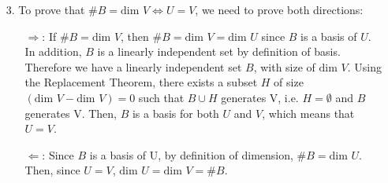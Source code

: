 \documentclass{article}
\begin{document}
\newpage
\begin{itemize}
	\item [3.] To prove that $\#B=\text{dim }V \Leftrightarrow U=V$, we need to prove both directions:
	      \begin{itemize}
		      \item [$\Rightarrow$:] If $\#B=\text{dim }V$, then $\#B=\text{dim }V=\text{dim }U$ since $B$ is a basis of $U$. In addition, $B$ is a linearly independent set by definition of basis. Therefore we have a linearly independent set $B$, with size of $\text{dim }V$. Using the Replacement Theorem, there exists a subset $H$ of size $(\text{dim }V-\text{dim }V)=0$ such that $B \cup H$ generates V, i.e. $H=\emptyset$ and $B$ generates V. Then, $B$ is a basis for both $U$ and $V$, which means that $U=V$.
		      \item [$\Leftarrow$:] Since $B$ is a basis of U, by definition of dimension, $\#B=\text{dim } U$. Then, since $U=V$, $\text{dim }U=\text{dim }V=\#B$.
	      \end{itemize}
\end{itemize}
\end{document}
